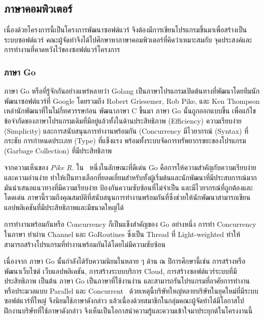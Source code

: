 \documentclass[12pt,one side,openright,a4paper]{cpe-thesis-th}
\newcommand{\thaijustify}[1]{%
  \par\hspace{30pt}\justifying
  #1
}
\begin{document}
\subsection{ภาษาคอมพิวเตอร์}
\thaijustify{
  เนื่องด้วยโครงการนี้เป็นโครงการพัฒนาซอฟต์แวร์ จึงต้องมีการเขียนโปรแกรมขึ้นมาเพื่อสร้างเป็นระบบซอฟต์แวร์ คณะผู้จัดทำจึงได้ไปศึกษาหาภาษาคอมพิวเตอร์ที่คิดว่าเหมาะสมกับ จุดประสงค์และการทำงานที่คาดหวังไว้ของซอฟต์แวร์โครงการ
}
\subsubsection{ภาษา Go}
\thaijustify{
  ภาษา Go หรือที่รู้จักกันอย่างแพร่หลายว่า Golang เป็นภาษาโปรแกรมเปิดต้นทางที่พัฒนาโดยทีมนักพัฒนาซอฟต์แวร์ที่ Google โดยรวมถึง Robert Griesemer, Rob Pike, และ Ken Thompson เหล่านักพัฒนาที่ในไม่กี่ทศวรรษก่อน พัฒนาภาษา C ขึ้นมา ภาษา Go นั้นถูกออกแบบขึ้น เพื่อแก้ไขข้อจำกัดของภาษาโปรแกรมเดิมที่มีอยู่แล้วทั้งในด้านประสิทธิภาพ (Efficiency) ความเรียบง่าย (Simplicity) และการสนับสนุนการทำงานพร้อมกัน (Concurrency มีไวยากรณ์ (Syntax) ที่กระชับ การกำหนดประเภท (Type) ที่แข็งแรง พร้อมทั้งระบบจัดการทรัพยากรขยะของโปรแกรม (Garbage Collection) ที่มีประสิทธิภาพ~\cite{pike12go, donovan15go}
}
\thaijustify{
  จากความเห็นของ \textit{Pike R.} ใน~\cite{pike12go, pike12godev} หนึ่งในลักษณะที่ดีเด่น Go คือการให้ความสำคัญกับความเรียบง่ายและความอ่านง่าย ทำให้เป็นทางเลือกที่ยอดเยี่ยมสำหรับทั้งผู้เริ่มต้นและนักพัฒนาที่มีประสบการณ์มาก มันนำเสนอแนวทางที่มีความเรียบง่าย ป้องกันความซับซ้อนที่ไม่จำเป็น และมีไวยากรณ์ที่ถูกต้องและโดดเด่น ภาษานี้รวมถึงคุณสมบัติที่สนับสนุนการทำงานพร้อมกันที่ซึ่งช่วยให้นักพัฒนาสามารถเขียนแอปพลิเคชันที่มีประสิทธิภาพและมีขนาดใหญ่ได้
}
\thaijustify{
  การทำงานพร้อมกันหรือ Concurrency ก็เป็นแข็งสำคัญของ Go อย่างหนึ่ง การทำ Concurrency ในภาษา ทำผ่าน Channel และ GoRoutines ซึ่งเป็น Thread ที่ Light-weighted ทำให้สามารถสร้างโปรแกรมที่ทำงานพร้อมกันได้โดยไม่มีความซับซ้อน~\cite{donovan15go}
}
\thaijustify{
  เนื่องจาก ภาษา Go นั้นกำลังได้รับความนิยมในหลาย ๆ ด้าน ณ ปีการศึกษานี้เช่น การสร้างหรือพัฒนาเว็บไซต์ เว็บแอปพลิเคชัน, การสร้างระบบบริการ Cloud, การสร้างซอฟต์แวร์ระบบที่มีประสิทธิภาพ เป็นต้น ภาษา Go เป็นภาษาที่ใช้งานง่าน และสามารถรันโปรแกรมที่อาศัยการทำงานหรือประมวลแบบ Parallel และ Concurrent~\cite{golangorg} ด้วยเหตุนี้บริษัทใหญ่หลายบริษัทในยุคใหม่ที่มีระบบซอฟต์แวร์ที่ใหญ่ จึงนิยมใช้ภาษาดังกล่าว แล้วเนื่องด้วยสมาชิกในกลุ่มคณะผู้จัดทำได้มีโอกาสไปฝึกงานบริษัทที่ใช้ภาษาดังกล่าว จึงเห็นเป็นโอกาสนำความรู้และความเข้าใจมาประยุกต์ในโครงงานนี้
}
\end{document}
